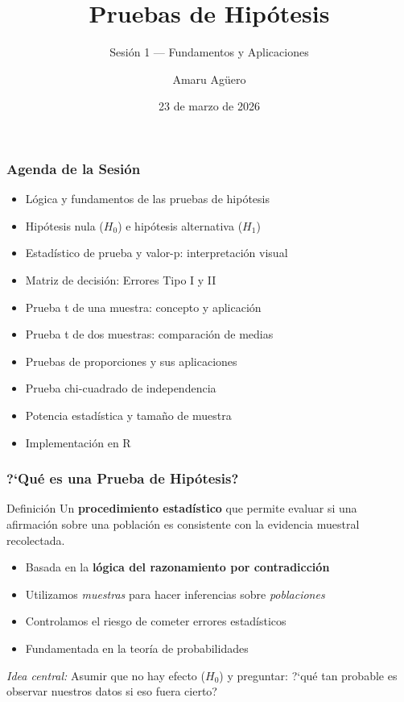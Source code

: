\documentclass[aspectratio=169,11pt]{beamer}
\institute[CICS --- UDD]{Doctorado en Ciencias de la Complejidad Social --- CICS, UDD}
\title{Pruebas de Hip\'otesis}
\subtitle{Sesi\'on 1 --- Fundamentos y Aplicaciones}
\author[A. Ag\"uero]{Amaru Ag\"uero}
\date{23 de marzo de 2026}
\newcommand{\highlight}[1]{\textcolor{uddlight}{\bfseries #1}}
\begin{document}
\begin{frame}[plain]
  \titlepage
\end{frame}

\begin{frame}
  \frametitle{Agenda de la Sesi\'on}
  \begin{itemize}
    \setlength{\itemsep}{4pt}
    \item L\'ogica y fundamentos de las pruebas de hip\'otesis
    \item Hip\'otesis nula ($H_0$) e hip\'otesis alternativa ($H_1$)
    \item Estad\'istico de prueba y valor-p: interpretaci\'on visual
    \item Matriz de decisi\'on: Errores Tipo I y II
    \item Prueba t de una muestra: concepto y aplicaci\'on
    \item Prueba t de dos muestras: comparaci\'on de medias
    \item Pruebas de proporciones y sus aplicaciones
    \item Prueba chi-cuadrado de independencia
    \item Potencia estad\'istica y tama\~no de muestra
    \item Implementaci\'on en R
  \end{itemize}
\end{frame}

\begin{frame}
  \frametitle{?`Qu\'e es una Prueba de Hip\'otesis?}
  \begin{block}{Definici\'on}
    Un \highlight{procedimiento estad\'istico} que permite evaluar si una afirmaci\'on sobre
    una poblaci\'on es consistente con la evidencia muestral recolectada.
  \end{block}
  \pause
  \begin{itemize}
    \setlength{\itemsep}{4pt}
    \item Basada en la \textbf{l\'ogica del razonamiento por contradicci\'on}
    \item Utilizamos \textit{muestras} para hacer inferencias sobre \textit{poblaciones}
    \item Controlamos el riesgo de cometer errores estad\'isticos
    \item Fundamentada en la teor\'ia de probabilidades
  \end{itemize}
  \pause
  \vspace{0.2cm}
  \textit{Idea central:} Asumir que no hay efecto ($H_0$) y preguntar: ?`qu\'e tan probable es observar nuestros datos si eso fuera cierto?
\end{frame}
\end{document}
